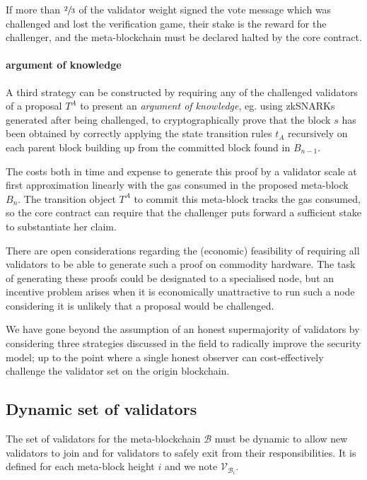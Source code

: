 \documentclass[12pt,a4paper]{article}
\begin{document}
If more than $\sfrac{2}{3}$ of the validator weight signed the vote message which was challenged and lost the verification game, their stake is the reward for the challenger, and the meta-blockchain must be declared halted by the core contract.

\paragraph{argument of knowledge} A third strategy can be constructed by requiring any of the challenged validators of a proposal $T^A$ to present an \emph{argument of knowledge}, eg. using \mbox{zkSNARKs} generated after being challenged, to cryptographically prove that the block $s$ has been obtained by correctly applying the state transition rules $t_A$ recursively on each parent block building up from the committed block found in $B_{n-1}$.

The costs both in time and expense to generate this proof by a validator scale at first approximation linearly with the gas consumed in the proposed meta-block $B_n$.
The transition object $T^A$ to commit this meta-block tracks the gas consumed, so the core contract can require that the challenger puts forward a sufficient stake to substantiate her claim.

There are open considerations regarding the (economic) feasibility of requiring all validators to be able to generate such a proof on commodity hardware.
The task of generating these proofs could be designated to a specialised node, but an incentive problem arises when it is economically unattractive to run such a node considering it is unlikely that a proposal would be challenged.

We have gone beyond the assumption of an honest supermajority of validators by considering three strategies discussed in the field to radically improve the security model; up to the point where a single honest observer can cost-effectively challenge the validator set on the origin blockchain.


\subsection{Dynamic set of validators}

The set of validators for the meta-blockchain $\mathcal{B}$ must be dynamic to allow new validators to join and for validators to safely exit from their responsibilities. It is defined for each meta-block height $i$ and we note $\mathcal{V}_{\mathcal{B}_i}$.
 
\end{document}

